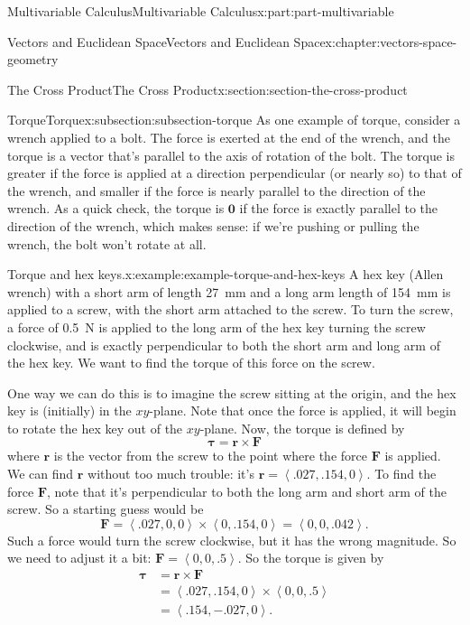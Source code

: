 \documentclass[twoside,10pt,]{book}
\numberwithin{equation}{part}
\newcommand{\dotprod}[1]{\left\langle #1 \right\rangle}
\begin{document}
\begin{partptx}{Multivariable Calculus}{}{Multivariable Calculus}{}{}{x:part:part-multivariable}
\begin{chapterptx}{Vectors and Euclidean Space}{}{Vectors and Euclidean Space}{}{}{x:chapter:vectors-space-geometry}
\begin{sectionptx}{The Cross Product}{}{The Cross Product}{}{}{x:section:section-the-cross-product}
\begin{subsectionptx}{Torque}{}{Torque}{}{}{x:subsection:subsection-torque}
As one example of torque, consider a wrench applied to a bolt. The force is exerted at the end of the wrench, and the torque is a vector that's parallel to the axis of rotation of the bolt. The torque is greater if the force is applied at a direction perpendicular (or nearly so) to that of the wrench, and smaller if the force is nearly parallel to the direction of the wrench. As a quick check, the torque is \(\mathbf{0}\) if the force is exactly parallel to the direction of the wrench, which makes sense: if we're pushing or pulling the wrench, the bolt won't rotate at all.%
\begin{example}{Torque and hex keys.}{x:example:example-torque-and-hex-keys}%
A hex key (Allen wrench) with a short arm of length \SI{27}{\milli\meter} and a long arm length of \SI{154}{\milli\meter} is applied to a screw, with the short arm attached to the screw. To turn the screw, a force of \SI{0.5}{\newton} is applied to the long arm of the hex key turning the screw clockwise, and is exactly perpendicular to both the short arm and long arm of the hex key. We want to find the torque of this force on the screw.%
\par
One way we can do this is to imagine the screw sitting at the origin, and the hex key is (initially) in the \(xy\)-plane. Note that once the force is applied, it will begin to rotate the hex key out of the \(xy\)-plane. Now, the torque is defined by%
%
\begin{equation*}
\boldsymbol{\tau} = \mathbf{r}\times\mathbf{F}
\end{equation*}
where \(\mathbf{r}\) is the vector from the screw to the point where the force \(\mathbf{F}\) is applied. We can find \(\mathbf{r}\) without too much trouble: it's \(\mathbf{r} = \dotprod{.027,.154,0}\). To find the force \(\mathbf{F}\), note that it's perpendicular to both the long arm and short arm of the screw. So a starting guess would be%
%
\begin{equation*}
\mathbf{F} = \dotprod{.027,0,0}\times\dotprod{0,.154,0} = \dotprod{0,0,.042}.
\end{equation*}
Such a force would turn the screw clockwise, but it has the wrong magnitude. So we need to adjust it a bit: \(\mathbf{F} = \dotprod{0,0,.5}\). So the torque is given by%
%
\begin{align*}
\mathbf{\tau} &= \mathbf{r}\times\mathbf{F} \\
& = \dotprod{.027,.154,0}\times\dotprod{0,0,.5} \\
& = \dotprod{.154,-.027,0}. 
\end{align*}

\end{example}
\end{subsectionptx}
\end{sectionptx}
\end{chapterptx}
\end{partptx}
\end{document}
